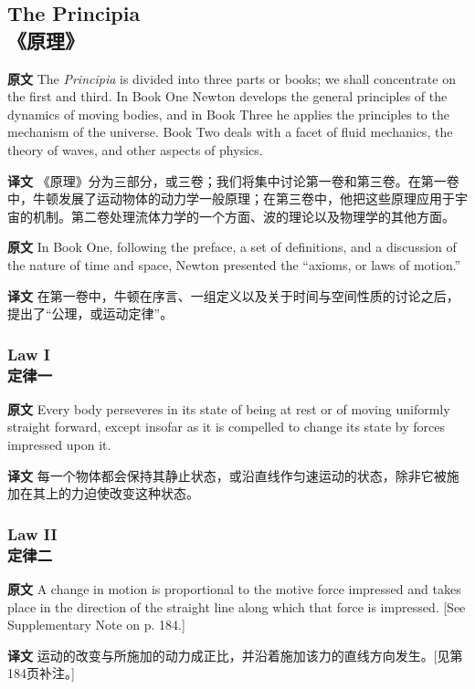 \documentclass[UTF8,zihao=-4]{ctexart}
\begin{document}
\subsection*{The Principia\\《原理》}

\noindent\textbf{原文} The \emph{Principia} is divided into three parts or books; we shall concentrate on the first and third. In Book One Newton develops the general principles of the dynamics of moving bodies, and in Book Three he applies the principles to the mechanism of the universe. Book Two deals with a facet of fluid mechanics, the theory of waves, and other aspects of physics.
\par\noindent\textbf{译文} 《原理》分为三部分，或三卷；我们将集中讨论第一卷和第三卷。在第一卷中，牛顿发展了运动物体的动力学一般原理；在第三卷中，他把这些原理应用于宇宙的机制。第二卷处理流体力学的一个方面、波的理论以及物理学的其他方面。
\medskip

\noindent\textbf{原文} In Book One, following the preface, a set of definitions, and a discussion of the nature of time and space, Newton presented the ``axioms, or laws of motion.''
\par\noindent\textbf{译文} 在第一卷中，牛顿在序言、一组定义以及关于时间与空间性质的讨论之后，提出了“公理，或运动定律”。
\medskip

\subsubsection*{Law I\\定律一}
\noindent\textbf{原文} Every body perseveres in its state of being at rest or of moving uniformly straight forward, except insofar as it is compelled to change its state by forces impressed upon it.
\par\noindent\textbf{译文} 每一个物体都会保持其静止状态，或沿直线作匀速运动的状态，除非它被施加在其上的力迫使改变这种状态。
\medskip

\subsubsection*{Law II\\定律二}
\noindent\textbf{原文} A change in motion is proportional to the motive force impressed and takes place in the direction of the straight line along which that force is impressed. [See Supplementary Note on p. 184.]
\par\noindent\textbf{译文} 运动的改变与所施加的动力成正比，并沿着施加该力的直线方向发生。[见第184页补注。]
\medskip
\end{document}
